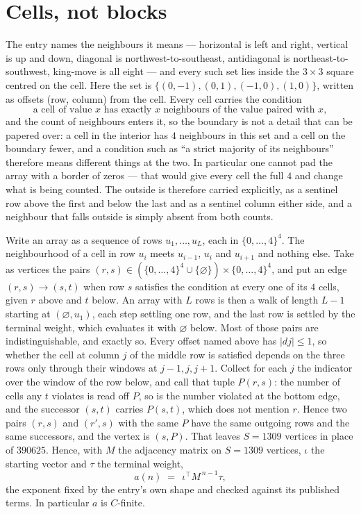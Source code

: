 \documentclass[11pt,a4paper]{article}
\theoremstyle{plain}
\theoremstyle{definition}
\begin{document}
\section{Cells, not blocks}

The entry names the neighbours it means --- horizontal is left and right, vertical is up and
down, diagonal is northwest-to-southeast, antidiagonal is northeast-to-southwest, king-move is
all eight --- and every such set lies inside the $3\times3$ square centred on the cell. Here
the set is $\{(0,-1), (0,1), (-1,0), (1,0)\}$, written as offsets (row, column) from the cell. Every cell carries
the condition
\[
\text{a cell of value }x\text{ has exactly }x\text{ neighbours of the value paired with }x,
\]
and the count of neighbours enters it, so the boundary is not a detail that can be papered
over: a cell in the interior has $4$ neighbours in this set and a cell on the boundary
fewer, and a condition such as ``a strict majority of its neighbours'' therefore means
different things at the two. In particular one cannot pad the array with a border of zeros ---
that would give every cell the full $4$ and change what is being counted. The outside is
therefore carried
explicitly, as a sentinel row above the first and below the last and as a sentinel column
either side, and a neighbour that falls outside is simply absent from both counts.

Write an array as a sequence of rows $u_1,\dots,u_L$, each in
$\{0,\dots,4\}^{4}$. The neighbourhood of a cell in row $u_i$ meets $u_{i-1}$,
$u_i$ and $u_{i+1}$ and nothing else. Take as vertices the pairs
$(r,s)\in(\{0,\dots,4\}^{4}\cup\{\varnothing\})\times\{0,\dots,4\}^{4}$,
and put an edge $(r,s)\to(s,t)$ when row $s$ satisfies the condition at every one of its
$4$ cells, given $r$ above and $t$ below. An array with $L$ rows is then a walk of length
$L-1$ starting at $(\varnothing,u_1)$, each step settling one row, and the last row is
settled by the terminal weight, which evaluates it with $\varnothing$ below. Most of those pairs are indistinguishable, and exactly so. Every offset named above has $|dj|\le 1$, so whether the cell at column $j$ of the middle row is satisfied depends on the three rows only through their windows at $j-1,j,j+1$. Collect for each $j$ the indicator over the window of the row below, and call that tuple $P(r,s)$: the number of cells any $t$ violates is read off $P$, so is the number violated at the bottom edge, and the successor $(s,t)$ carries $P(s,t)$, which does not mention $r$. Hence two pairs $(r,s)$ and $(r',s)$ with the same $P$ have the same outgoing rows and the same successors, and the vertex is $(s,P)$. That leaves $S=1309$ vertices in place of $390625$. Hence,
with $M$ the adjacency matrix on $S=1309$ vertices, $\iota$ the starting vector and $\tau$ the
terminal weight,
\[
a(n)\;=\;\,\iota^{\!\top}M^{\,n-1}\tau ,
\]
the exponent fixed by the entry's own shape and checked against its published terms. In
particular $a$ is $C$-finite.
\end{document}
